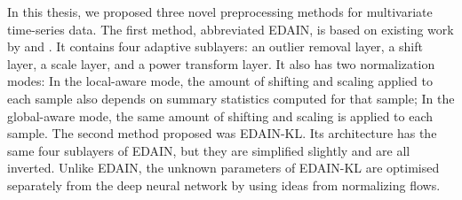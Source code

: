 \documentclass{statsmsc}
\begin{document}
{%
In this thesis, we proposed three novel preprocessing methods for multivariate time-series data.
The first method, abbreviated \ac{EDAIN}, is based on existing work by \cite{dain} and
\cite{bin}. It contains four adaptive sublayers: an outlier removal layer, a shift layer,
a scale layer, and a power transform layer. It also has two normalization modes: In the local-aware
mode, the amount of shifting and scaling applied to each sample also depends on summary
statistics computed for that sample; In the global-aware mode, the same amount
of shifting and scaling is applied to each sample. 
The second method proposed was \ac{EDAIN-KL}. Its architecture has the same four sublayers of
\ac{EDAIN}, but they are simplified slightly and are all inverted. Unlike \ac{EDAIN}, the
unknown parameters of \ac{EDAIN-KL} are optimised separately from the deep neural network by
using ideas from normalizing flows. %
}
\end{document}
